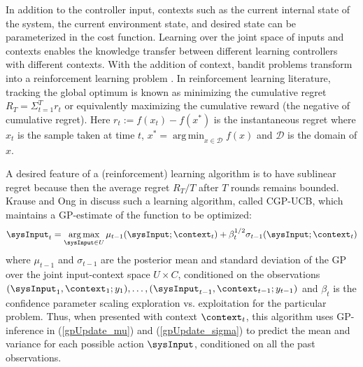 In addition to the controller input, contexts such as the current internal state of the system, the current environment state, and desired state can be parameterized in the cost function. 
Learning over the joint space of inputs and contexts enables the knowledge transfer between different learning controllers with different contexts. 
With the addition of context, bandit problems transform into a reinforcement learning problem \cite{Sutton98}. In reinforcement learning literature, tracking the global optimum is known as minimizing the cumulative regret $R_{T} = \Sigma_{t = 1}^{T}r_{t} $ or equivalently maximizing the cumulative reward (the negative of cumulative regret). Here $r_{t} := f(x_{t}) - f(x^{*})$ is the instantaneous regret where $x_t$ is the sample taken at time $t$, $x^{*} = \operatorname*{arg\,min}_{x \in \mathcal{D}}f(x)$ and $\mathcal{D}$ is the domain of $x$. 

A desired feature of a (reinforcement) learning algorithm is to have sublinear regret because then the average regret $R_{T}/T$ after $T$ rounds remains bounded. 
Krause and Ong in  discuss such a learning algorithm, called CGP-UCB, which maintains a GP-estimate of the function to be optimized: 
\begin{equation}
\sysInput_{t} = \operatorname*{arg\,max}_{\sysInput \in U}\mu_{t-1}(\sysInput;\context_t) + \beta_{t}^{1/2}\sigma_{t-1}(\sysInput;\context_t) \label{ucb}
\end{equation}
where $\mu_{t-1}$ and $\sigma_{t-1}$ are the posterior mean and standard deviation of the GP over the joint input-context space $U \times C$, conditioned on the observations $(\sysInput_1,\context_1; y_1),\ldots,(\sysInput_{t-1},\context_{t-1}; y_{t-1})$ and $\beta_{t}$ is the confidence parameter scaling exploration vs. exploitation for the particular problem. Thus, when presented with context $\context_t$, this algorithm uses GP-inference in (\ref{gpUpdate_mu}) and (\ref{gpUpdate_sigma}) to predict the mean and variance for each possible action $\sysInput$, conditioned on all the past observations.
